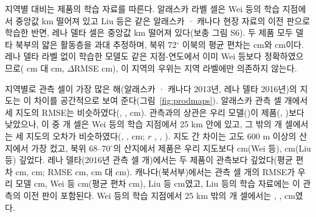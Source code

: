 
지역별 대비는 제품의 학습 자료를 따른다. 알래스카 라벨 셀은 Wei 등의 학습 지점에서 중앙값 \ndistweiAkmed{} km 떨어져 있고 Liu 등은 같은 알래스카 · 캐나다 현장 자료의 이전 판으로 학습한 반면, 레나 델타 셀은 중앙값 \ndistweiLemed{} km 떨어져 있다(보충 그림 S6). 두 제품 모두 델타 북부의 얇은 활동층을 과대 추정하며, 북위 72$^\circ$ 이북의 평균 편차는 \nbiasLeNorthWei{} cm와 \nbiasLeNorthLiu{} cm이다. 레나 델타 라벨 없이 학습한 모델도 같은 지점-연도에서 이미 Wei 등보다 정확하였으므로(\ntlvprmseLeRsWeizero{} cm 대 \ntlvprmseLeWeizero{} cm, $\Delta$RMSE \ntlvpLeRsWeizero{} cm), 이 지역의 우위는 지역 라벨에만 의존하지 않는다.

지역별로 관측 셀이 가장 많은 해(알래스카 · 캐나다 2013년, 레나 델타 2016년)의 지도는 이 차이를 공간적으로 보여 준다(그림~\ref{fig:prodmaps}). 알래스카 관측 셀 \nfeAkN{}개에서 세 지도의 RMSE는 비슷하였다(\nfeAkOof, \nfeAkWei, \nfeAkLiu{} cm). 관측과의 상관은 우리 모델(\nfeAkROof)이 제품(\nfeAkRWei, \nfeAkRLiu)보다 낮았으나, 이 중 \nfeAkNNear{}개 셀은 Wei 등의 학습 지점에서 25 km 안에 있고, 그 밖의 \nfeAkNFar{}개 셀에서는 세 지도의 오차가 비슷하였다(\nfeAkFarOof, \nfeAkFarWei, \nfeAkFarLiu{} cm; $r$ \nfeAkFarROof, \nfeAkFarRWei, \nfeAkFarRLiu). 지도 간 차이는 고도 600 m 이상의 산지에서 가장 컸고, 북위 68--70$^\circ$의 산지에서 제품은 우리 지도보다 \nmapAkFootMtnWei{} cm(Wei 등), \nmapAkFootMtnLiu{} cm(Liu 등) 깊었다. 레나 델타(2016년 관측 셀 \nfeLeN{}개)에서는 두 제품이 관측보다 깊었다(평균 편차 \nfeLeBiasWei{} cm, \nfeLeBiasLiu{} cm; RMSE \nfeLeWei{} cm, \nfeLeLiu{} cm 대 \nfeLeOof{} cm). 캐나다(북서부)에서는 관측 셀 \nfeCaN{}개의 RMSE가 우리 모델 \nfeCaOof{} cm, Wei 등 \nfeCaWei{} cm(평균 편차 \nfeCaBiasWei{} cm), Liu 등 \nfeCaLiu{} cm였고, Liu 등의 학습 자료에는 이 관측의 이전 판이 포함된다. Wei 등의 학습 지점에서 25 km 밖의 \nfeCaNFar{}개 셀에서는 \nfeCaFarOof, \nfeCaFarWei, \nfeCaFarLiu{} cm였다.


